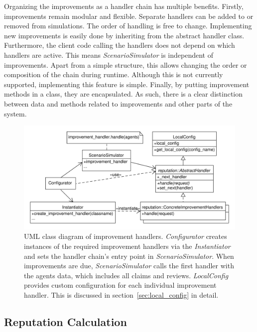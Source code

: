 \documentclass[%
    ]{\PathToTumTemplate/thesis/tum_thesis}
\begin{document}
Organizing the improvements as a handler chain has multiple benefits.
Firstly, improvements remain modular and flexible.
Separate handlers can be added to or removed from simulations.
The order of handling is free to change.
Implementing new improvements is easily done by inheriting from the abstract handler class.
Furthermore, the client code calling the handlers does not depend on which handlers are active.
This means \emph{ScenarioSimulator} is independent of improvements.
Apart from a simple structure, this allows changing the order or composition of the chain during runtime.
Although this is not currently supported, implementing this feature is simple.
Finally, by putting improvement methods in a class, they are encapsulated.
As such, there is a clear distinction between data and methods related to improvements and other parts of the system.

\begin{figure}[tbp]
  \begin{center}
        \includegraphics[width=1\linewidth]	{../uml/improvement_handlers.pdf}
    \caption{
	UML class diagram of improvement handlers. 
	\emph{Configurator} creates instances of the required improvement handlers via the \emph{Instantiator} and sets the handler chain's entry point in \emph{ScenarioSimulator}.
	When improvements are due, \emph{ScenarioSimulator} calls the first handler with the agents data, which includes all claims and reviews.
	\emph{LocalConfig} provides custom configuration for each individual improvement handler.
	This is discussed in section~\ref{sec:local_config} in detail.
    }
    \label{fig:improvement_handlers}
  \end{center}
\end{figure}

\subsection{Reputation Calculation}\label{sec:impl_reputation_calculation}
\end{document}
